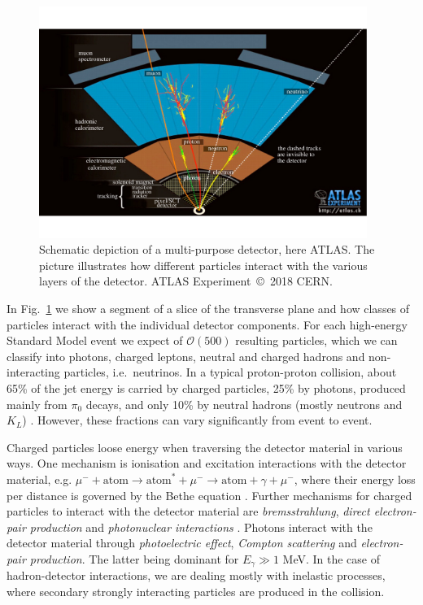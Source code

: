 \begin{figure}
  \centerline{\includegraphics[width=0.95\textwidth]{figures/detector_large.pdf}}
  \caption{Schematic depiction of a multi-purpose detector, here ATLAS. The picture illustrates how different particles interact with the various layers of the detector.  
  ATLAS Experiment~\copyright~2018 CERN.
}
  \label{fig:interaction}
\end{figure}


In Fig.~\ref{fig:interaction} we show a segment of a slice of the transverse plane and how classes of particles interact with the individual detector components. For each high-energy Standard Model event we expect of $\mathcal{O}(500)$ resulting particles, which we can classify into photons, charged leptons, neutral and charged hadrons and non-interacting particles, i.e.\ neutrinos. In a typical proton-proton collision, about 65\% of the jet energy is carried by charged particles, 25\% by photons, produced mainly from $\pi_0$ decays, and only 10\% by neutral hadrons (mostly neutrons and $K_{L} $) \cite{CMS:2010byl, CMS:2010eua}. However, these fractions can vary significantly from event to event.

 
Charged particles loose energy when traversing the detector material in various ways. One mechanism is ionisation and excitation interactions with the detector material, e.g. $\mu^- + \mathrm{atom} \to \mathrm{atom}^* + \mu^- \to \mathrm{atom} + \gamma + \mu^-$, where their energy loss per distance is governed by the Bethe equation \cite{Tanabashi:2018oca}. Further mechanisms for charged particles to interact with the detector material are {\it bremsstrahlung}, {\it direct electron-pair production} and {\it photonuclear interactions
}. 
Photons interact with the detector material through {\it photoelectric effect}, {\it Compton scattering} and {\it electron-pair production}. The latter being dominant for $E_\gamma \gg 1$ MeV.
In the case of hadron-detector interactions, we are dealing mostly with inelastic processes, where secondary strongly interacting particles are produced in the collision.

